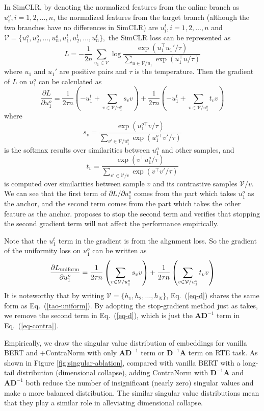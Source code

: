 \documentclass{article}
\def\mA{{\bm{A}}}
\def\mD{{\bm{D}}}
\theoremstyle{definition}
\theoremstyle{remark}
\theoremstyle{theorem}
\begin{document}
In SimCLR, by denoting the normalized features from the online branch as $u^o_i, i=1,2,\dots,n$, the normalized features from the target branch (although the two branches have no differences in SimCLR) are $u^t_i,i=1,2,\dots,n$ and $\mathcal{V}=\{u_1^o,u_2^o,\dots,u_n^o,u_1^t,u_2^t,\dots,u_n^t\},$ the SimCLR loss can be represented as
$$L=-\frac{1}{2n}\sum_{u_1\in\mathcal{V}}\log\frac{\exp(u_1^{\top}u_1'/\tau)}{\sum_{u\in\mathcal{V}/u_1}\exp(u_1^{\top}u/\tau)}$$
where $u_1$ and $u_1'$ are positive pairs and $\tau$ is the temperature. Then the gradient of $L$ on $u_1^o$ can be calculated as
$$\frac{\partial L}{\partial u_1^o}=\frac{1}{2\tau n}\left(-u_1^t+\sum_{v\in{\mathcal{V}/u_1^o}}s_vv\right)+\frac{1}{2\tau n}\left(-u_1^t+\sum_{v\in\mathcal{V}/u_1^o}t_vv\right)$$
where
$$s_v=\frac{\exp(u_1^{o\top}v/\tau)}{\sum_{v'\in\mathcal{V}/u_1^o}\exp(u_1^{o\top}v'/\tau)}$$
is the softmax results over similarities between $u_1^o$ and other samples, and
$$t_v=\frac{\exp(v^{\top}u_1^o/\tau)}{\sum_{v'\in\mathcal{V}/v}\exp(v^{\top}v'/\tau)}$$
is computed over similarities between sample $v$ and its contrastive samples $\mathcal{V}/v$. We can see that the first term of $\partial L/\partial u_1^o$ comes from the part which takes $u_1^o$ as the anchor, and the second term comes from the part which takes the other feature as the anchor. \cite{tao2022exploring} proposes to stop the second term and verifies that stopping the second gradient term will not affect the performance empirically.

Note that the $u_1^t$ term in the gradient is from the alignment loss. So the gradient of the uniformity loss on $u_1^o$ can be written as
\begin{equation}\frac{\partial L_{\rm{uniform}}}{\partial u_1^o}=\frac{1}{2\tau n}\left(\sum_{v\in{\mathcal{V}/u_1^o}}s_vv\right)+\frac{1}{2\tau n}\left(\sum_{v\in\mathcal{V}/u_1^o}t_vv\right)\label{tao-uniform}\end{equation}
It is noteworthy that by writing $\mathcal{V}=\{h_1,h_2,\dots,h_N\}$, Eq.~(\ref{eq-d}) shares the same form as Eq.~(\ref{tao-uniform}). By adopting the stop-gradient method just as \cite{tao2022exploring} takes, we remove the second term in Eq.~(\ref{eq-d}), which is just the $\mA\mD^{-1}$ term in Eq.~(\ref{eq-contra}). 

Empirically, we draw the singular value distribution of embeddings for vanilla BERT and +ContraNorm with only $\mA\mD^{-1}$ term or $\mD^{-1}\mA$ term on RTE task. As shown in Figure \ref{fig:singular-ablation}, compared with vanilla BERT with a long-tail distribution (dimensional collapse), adding ContraNorm with $\mD^{-1}\mA$ and $\mA\mD^{-1}$ both reduce the number of insignificant (nearly zero) singular values and make a more balanced distribution. The similar singular value distributions mean that they play a similar role in alleviating dimensional collapse. 
\end{document}
